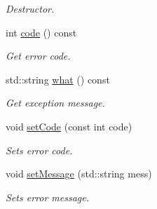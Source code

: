 \begin{DoxyCompactItemize}
\begin{DoxyCompactList}\small\item\em Destructor. \item\end{DoxyCompactList}\item 
int \hyperlink{classChEngn_1_1Exception_a49bdf86c61bc027c512f3c9c6e74a2ad}{code} () const 
\begin{DoxyCompactList}\small\item\em Get error code. \item\end{DoxyCompactList}\item 
std::string \hyperlink{classChEngn_1_1Exception_a10bfdb3b9a25cde9a5c09272d3258788}{what} () const 
\begin{DoxyCompactList}\small\item\em Get exception message. \item\end{DoxyCompactList}\item 
void \hyperlink{classChEngn_1_1Exception_a80e1913344d7d230cbbbab621bad8d28}{setCode} (const int code)
\begin{DoxyCompactList}\small\item\em Sets error code. \item\end{DoxyCompactList}\item 
void \hyperlink{classChEngn_1_1Exception_abb512c199834ae75a74e9674cce6090b}{setMessage} (std::string mess)
\begin{DoxyCompactList}\small\item\em Sets error message. \item\end{DoxyCompactList}\end{DoxyCompactItemize}


